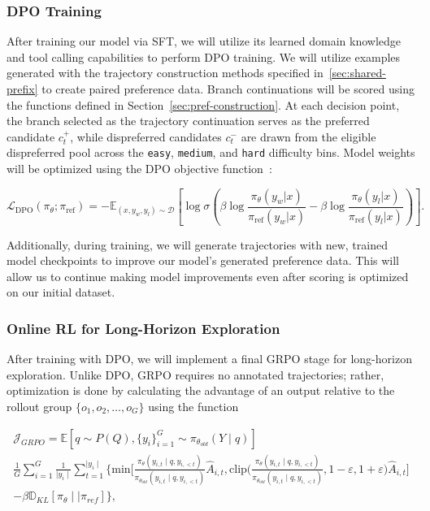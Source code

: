 \documentclass[thesis,letterpaper,12pt]{utthesis}
\begin{document}
\subsubsection{DPO Training}
After training our model via SFT, we will utilize its learned domain knowledge and tool calling capabilities to perform DPO training. We will utilize examples generated with the trajectory construction methods specified in~\ref{sec:shared-prefix} to create paired preference data. Branch continuations will be scored using the functions defined in Section~\ref{sec:pref-construction}. At each decision point, the branch selected as the trajectory continuation serves as the preferred candidate $c_t^+$, while dispreferred candidates $c_t^-$ are drawn from the eligible dispreferred pool across the \texttt{easy}, \texttt{medium}, and \texttt{hard} difficulty bins. Model weights will be optimized using the DPO objective function~\cite{dpo}:

\[
\mathcal{L}_{\text{DPO}}(\pi_\theta; \pi_{\text{ref}}) = -\mathbb{E}_{(x, y_w, y_l) \sim \mathcal{D}} \left[ \log \sigma \left( \beta \log \frac{\pi_\theta(y_w | x)}{\pi_{\text{ref}}(y_w | x)} - \beta \log \frac{\pi_\theta(y_l | x)}{\pi_{\text{ref}}(y_l | x)} \right) \right].
\]

Additionally, during training, we will generate trajectories with new, trained model checkpoints to improve our model's generated preference data. This will allow us to continue making model improvements even after scoring is optimized on our initial dataset.

\subsubsection{Online RL for Long-Horizon Exploration}
After training with DPO, we will implement a final GRPO stage for long-horizon exploration. Unlike DPO, GRPO requires no annotated trajectories; rather, optimization is done by calculating the advantage of an output relative to the rollout group $\{o_1, o_2, \dots, o_G\}$ using the function

\begin{multline*}
    \mathcal{J}_{GRPO} = \mathbb{E}[q \sim P(Q), \{y_i\}_{i=1}^{G} \sim \pi_{\theta_{old}}(Y\mid q)] \\
    \frac{1}{G} \sum_{i=1}^{G}\frac{1}{\mid y_i \mid} \sum_{t=1}^{\mid y_i \mid} \Bigg \{ \text{min} \Big [ \frac{\pi_\theta (y_{i,t}\mid q, y_{i, <t})}{\pi_{\theta_{old}}(y_{i,t}\mid q, y_{i, <t})} \hat A_{i,t}, \text{clip} \Big( \frac{\pi_\theta (y_{i,t}\mid q, y_{i, <t})}{\pi_{\theta_{old}}(y_{i,t}\mid q, y_{i, <t})}, 1 - \varepsilon, 1 + \varepsilon \Big) \hat A_{i,t} \Big] \\
    - \beta \mathbb{D}_{KL} [\pi_\theta \mid\mid \pi_{ref}] \Bigg \},
\end{multline*}
\end{document}
